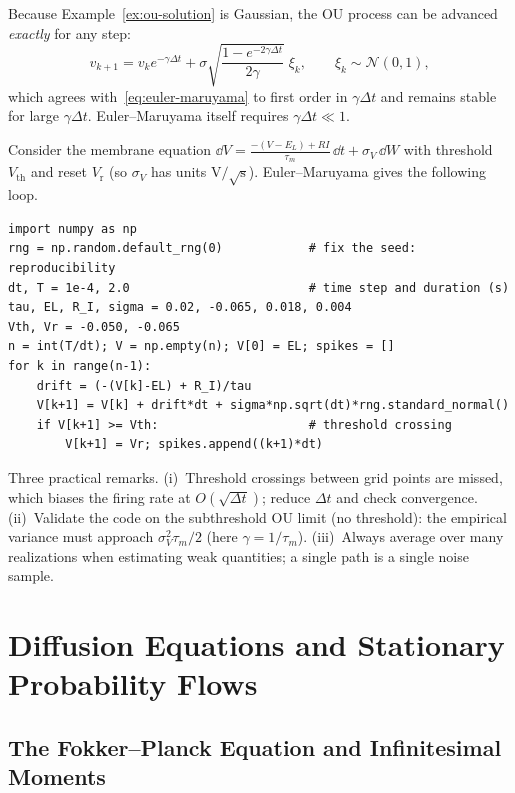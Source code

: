 \begin{example}
\label{ex:ou-exact}
Because Example~\ref{ex:ou-solution} is Gaussian, the OU process can be advanced \emph{exactly} for any step:
\[
v_{k+1}=v_ke^{-\gamma\Delta t}+\sigma\sqrt{\frac{1-e^{-2\gamma\Delta t}}{2\gamma}}\;\xi_k,\qquad\xi_k\sim\mathcal N(0,1),
\]
which agrees with~\eqref{eq:euler-maruyama} to first order in $\gamma\Delta t$ and remains stable for large $\gamma\Delta t$. Euler--Maruyama itself requires $\gamma\Delta t\ll1$.
\end{example}

\begin{example}
\label{ex:noisy-lif}
Consider the membrane equation $\dd V=\frac{-(V-E_L)+RI}{\tau_m}\,\dd t+\sigma_V\,\dd W$ with threshold $V_{\mathrm{th}}$ and reset $V_{\mathrm r}$ (so $\sigma_V$ has units $\mathrm{V}/\sqrt{\mathrm s}$). Euler--Maruyama gives the following loop.
\begin{verbatim}
import numpy as np
rng = np.random.default_rng(0)            # fix the seed: reproducibility
dt, T = 1e-4, 2.0                         # time step and duration (s)
tau, EL, R_I, sigma = 0.02, -0.065, 0.018, 0.004
Vth, Vr = -0.050, -0.065
n = int(T/dt); V = np.empty(n); V[0] = EL; spikes = []
for k in range(n-1):
    drift = (-(V[k]-EL) + R_I)/tau
    V[k+1] = V[k] + drift*dt + sigma*np.sqrt(dt)*rng.standard_normal()
    if V[k+1] >= Vth:                     # threshold crossing
        V[k+1] = Vr; spikes.append((k+1)*dt)
\end{verbatim}
Three practical remarks. (i)~Threshold crossings between grid points are missed, which biases the firing rate at $O(\sqrt{\Delta t})$; reduce $\Delta t$ and check convergence. (ii)~Validate the code on the subthreshold OU limit (no threshold): the empirical variance must approach $\sigma_V^2\tau_m/2$ (here $\gamma=1/\tau_m$). (iii)~Always average over many realizations when estimating weak quantities; a single path is a single noise sample.
\end{example}

\section{Diffusion Equations and Stationary Probability Flows}
\label{sec:fokker-planck-section}

\subsection{The Fokker--Planck Equation and Infinitesimal Moments}


